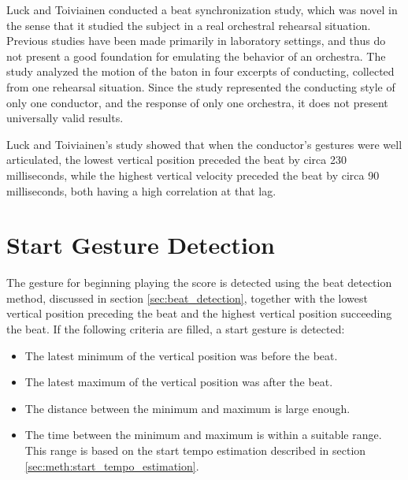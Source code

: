 Luck and Toiviainen \cite{luck2006}
conducted a beat synchronization study,
which was novel in the sense that it studied
the subject in a real orchestral rehearsal situation.
Previous studies have been made primarily in laboratory settings,
and thus do not present a good foundation
for emulating the behavior of an orchestra.
The study analyzed the motion of the baton
in four excerpts of conducting,
collected from one rehearsal situation.
Since the study represented the conducting style of only one conductor,
and the response of only one orchestra,
it does not present universally valid results.


Luck and Toiviainen's study showed that when the conductor's gestures were well articulated,
the lowest vertical position preceded the beat by circa 230 milliseconds,
while the highest vertical velocity preceded the beat by circa 90 milliseconds,
both having a high correlation at that lag.

\section{Start Gesture Detection}

The gesture for beginning playing the score
is detected using the beat detection method,
discussed in section \ref{sec:beat_detection},
together with the lowest vertical position preceding the beat and
the highest vertical position succeeding the beat.
If the following criteria are filled,
a start gesture is detected:
\begin{itemize}
\item The latest minimum of the vertical position was before the beat.
\item The latest maximum of the vertical position was after the beat.
\item The distance between the minimum and maximum is large enough.
\item The time between the minimum and maximum is within a suitable range.
This range is based on the start tempo estimation described in section
\ref{sec:meth:start_tempo_estimation}.
\end{itemize}

